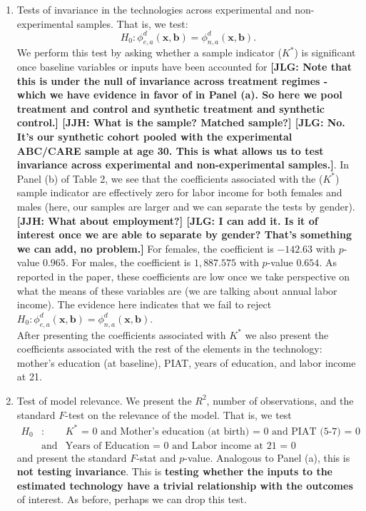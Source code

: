 \begin{enumerate}
\item Tests of invariance in the technologies across experimental and non-experimental samples. That is, we test:
	\begin{equation} 
	H_0: \phi_{e,a}^d \left( \bm{x}, \bm{b} \right) = \phi_{n,a}^d \left( \bm{x}, \bm{b} \right).
	\end{equation}
\noindent We perform this test by asking whether a sample indicator ($K^*$) is significant once baseline variables or inputs have been accounted for \textbf{[JLG: Note that this is under the null of invariance across treatment regimes - which we have evidence in favor of in Panel (a). So here we pool treatment and control and synthetic treatment and synthetic control.] [JJH: What is the sample? Matched sample?] [JLG: No. It's our synthetic cohort pooled with the experimental ABC/CARE sample at age 30. This is what allows us to test invariance across experimental and non-experimental samples.]}. In Panel (b) of Table 2, we see that the coefficients associated with the ($K^*$) sample indicator are effectively zero for labor income for both females and males (here, our samples are larger and we can separate the tests by gender). \textbf{[JJH: What about employment?] [JLG: I can add it. Is it of interest once we are able to separate by gender? That's something we can add, no problem.]} For females, the coefficient is $-142.63$ with $p$-value $0.965$. For males, the coefficient is $1,887.575$ with $p$-value $0.654$. As reported in the paper, these coefficients are low once we take perspective on what the means of these variables are (we are talking about annual labor income). The evidence here indicates that we fail to reject $H_0: \phi_{e,a}^d \left( \bm{x}, \bm{b} \right) = \phi_{n,a}^d \left( \bm{x}, \bm{b} \right)$.\\ 

\noindent After presenting the coefficients associated with $K^*$ we also present the coefficients associated with the rest of the elements in the technology: mother's education (at baseline), PIAT, years of education, and labor income at 21.\\

\item Test of model relevance. We present the $R^2$, number of observations, and the standard $F$-test on the relevance of the model. That is, we test 
	\begin{eqnarray} 
	H_0&:& \text{$K^*$ = 0 and Mother's education (at birth) = 0 and PIAT (5-7) = 0} \nonumber \\ 
	      & \text{and} & \text{Years of Education = 0 and Labor income at 21 = 0}
	\end{eqnarray}
\noindent and present the standard $F$-stat and $p$-value. Analogous to Panel (a), this is \textbf{not testing invariance}. This is \textbf{testing whether the inputs to the estimated technology have a trivial relationship with the outcomes} of interest. As before, perhaps we can drop this test.\\


\end{enumerate}
